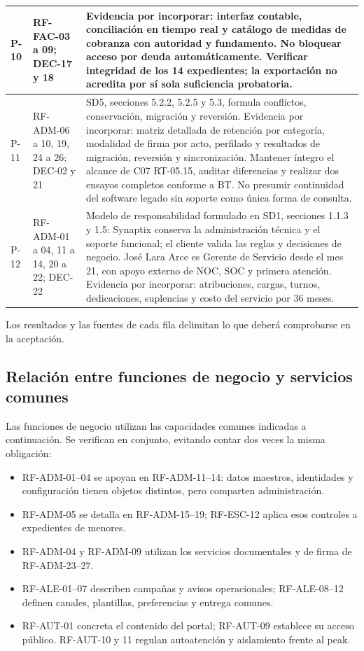 \begin{longtable}{|L{0.057471\AnchoTablaAnexo}|L{0.199234\AnchoTablaAnexo}|L{0.743295\AnchoTablaAnexo}|}
P-10 & RF-FAC-03 a 09; DEC-17 y 18 & Evidencia por incorporar: interfaz contable, conciliación en tiempo real y catálogo de medidas de cobranza con autoridad y fundamento. No bloquear acceso por deuda automáticamente. Verificar integridad de los 14 expedientes; la exportación no acredita por sí sola suficiencia probatoria. \\ \hline

P-11 & RF-ADM-06 a 10, 19, 24 a 26; DEC-02 y 21 & SD5, secciones 5.2.2, 5.2.5 y 5.3, formula conflictos, conservación, migración y reversión. Evidencia por incorporar: matriz detallada de retención por categoría, modalidad de firma por acto, perfilado y resultados de migración, reversión y sincronización. Mantener íntegro el alcance de C07 RT-05.15, auditar diferencias y realizar dos ensayos completos conforme a BT. No presumir continuidad del software legado sin soporte como única forma de consulta. \\ \hline

P-12 & RF-ADM-01 a 04, 11 a 14, 20 a 22; DEC-22 & Modelo de responsabilidad formulado en SD1, secciones 1.1.3 y 1.5: Synaptix conserva la administración técnica y el soporte funcional; el cliente valida las reglas y decisiones de negocio. José Lara Arce es Gerente de Servicio desde el mes 21, con apoyo externo de NOC, SOC y primera atención. Evidencia por incorporar: atribuciones, cargas, turnos, dedicaciones, suplencias y costo del servicio por 36 meses. \\ \hline

\end{longtable}

Los resultados y las fuentes de cada fila delimitan lo que deberá comprobarse en la aceptación.

\subsection*{Relación entre funciones de negocio y servicios comunes}
Las funciones de negocio utilizan las capacidades comunes indicadas a continuación.
Se verifican en conjunto, evitando contar dos veces la misma obligación:
\begin{itemize}
\item RF-ADM-01--04 se apoyan en RF-ADM-11--14: datos maestros, identidades y configuración tienen objetos distintos, pero comparten administración.
\item RF-ADM-05 se detalla en RF-ADM-15--19; RF-ESC-12 aplica esos controles a expedientes de menores.
\item RF-ADM-04 y RF-ADM-09 utilizan los servicios documentales y de firma de RF-ADM-23--27.
\item RF-ALE-01--07 describen campañas y avisos operacionales; RF-ALE-08--12 definen canales, plantillas, preferencias y entrega comunes.
\item RF-AUT-01 concreta el contenido del portal; RF-AUT-09 establece su acceso público. RF-AUT-10 y 11 regulan autoatención y aislamiento frente al peak.
\end{itemize}
